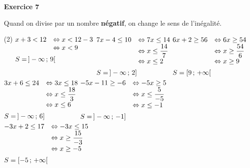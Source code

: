 \documentclass[a4paper,11pt]{article}
\newenvironment{exercice}[1]{%
  \Needspace{6\baselineskip}\par\bigskip\noindent\textbf{Exercice #1}\par\smallskip\noindent\ignorespaces
}{%
  \par
}
\begin{document}
\begin{exercice}{7}
Quand on divise par un nombre \textbf{négatif}, on change le sens de l'inégalité.
\begin{tasks}(2)
\task $\begin{array}[t]{@{}rl@{}}
  x+3<12 & \Leftrightarrow x<12-3\\
  & \Leftrightarrow x<9\\[0.5em]
  \multicolumn{2}{@{}l@{}}{S=\,]-\infty\,;\,9[}
\end{array}$
\task $\begin{array}[t]{@{}rl@{}}
  7x-4\leq 10 & \Leftrightarrow 7x\leq 14\\
  & \Leftrightarrow x\leq \dfrac{14}{7}\\
  & \Leftrightarrow x\leq 2\\[0.5em]
  \multicolumn{2}{@{}l@{}}{S=\,]-\infty\,;\,2]}
\end{array}$
\task $\begin{array}[t]{@{}rl@{}}
  6x+2\geq 56 & \Leftrightarrow 6x\geq 54\\
  & \Leftrightarrow x\geq \dfrac{54}{6}\\
  & \Leftrightarrow x\geq 9\\[0.5em]
  \multicolumn{2}{@{}l@{}}{S=[9\,;\,+\infty[}
\end{array}$
\task $\begin{array}[t]{@{}rl@{}}
  3x+6\leq 24 & \Leftrightarrow 3x\leq 18\\
  & \Leftrightarrow x\leq \dfrac{18}{3}\\
  & \Leftrightarrow x\leq 6\\[0.5em]
  \multicolumn{2}{@{}l@{}}{S=\,]-\infty\,;\,6]}
\end{array}$
\task $\begin{array}[t]{@{}rl@{}}
  -5x-11\geq -6 & \Leftrightarrow -5x\geq 5\\
  & \Leftrightarrow x\leq \dfrac{5}{-5}\\
  & \Leftrightarrow x\leq -1\\[0.5em]
  \multicolumn{2}{@{}l@{}}{S=\,]-\infty\,;\,-1]}
\end{array}$
\task $\begin{array}[t]{@{}rl@{}}
  -3x+2\leq 17 & \Leftrightarrow -3x\leq 15\\
  & \Leftrightarrow x\geq \dfrac{15}{-3}\\
  & \Leftrightarrow x\geq -5\\[0.5em]
  \multicolumn{2}{@{}l@{}}{S=[-5\,;\,+\infty[}
\end{array}$
\end{tasks}
\end{exercice}
\end{document}
